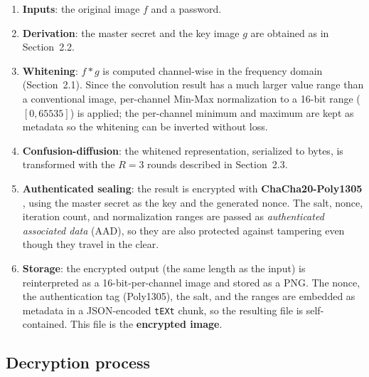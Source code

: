 \documentclass{llncs}
\begin{document}
\begin{enumerate}
  \item \textbf{Inputs}: the original image $f$ and a password.
  \item \textbf{Derivation}: the master secret and the key image $g$ are
    obtained as in Section~2.2.
  \item \textbf{Whitening}: $f*g$ is computed channel-wise in the frequency
    domain (Section~2.1). Since the convolution result has a much larger
    value range than a conventional image, per-channel Min-Max normalization
    to a 16-bit range ($[0,65535]$) is applied; the per-channel minimum and
    maximum are kept as metadata so the whitening can be inverted without
    loss.
  \item \textbf{Confusion-diffusion}: the whitened representation, serialized
    to bytes, is transformed with the $R=3$ rounds described in Section~2.3.
  \item \textbf{Authenticated sealing}: the result is encrypted with
    \textbf{ChaCha20-Poly1305} \cite{rfc8439}, using the master secret as the
    key and the generated nonce. The salt, nonce, iteration count, and
    normalization ranges are passed as \emph{authenticated associated data}
    (AAD), so they are also protected against tampering even though they
    travel in the clear.
  \item \textbf{Storage}: the encrypted output (the same length as the
    input) is reinterpreted as a 16-bit-per-channel image and stored as a
    PNG. The nonce, the authentication tag (Poly1305), the salt, and the
    ranges are embedded as metadata in a JSON-encoded \texttt{tEXt} chunk, so
    the resulting file is self-contained. This file is the \textbf{encrypted
    image}.
\end{enumerate}

\subsection{Decryption process}
\end{document}
